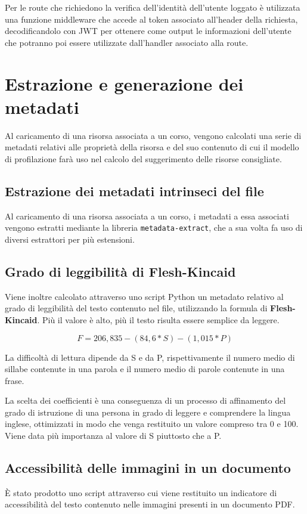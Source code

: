 Per le route che richiedono la verifica dell'identità dell'utente loggato è utilizzata una funzione middleware che accede al token associato all'header della richiesta, decodificandolo con JWT per ottenere come output le informazioni dell'utente che potranno poi essere utilizzate dall'handler associato alla route.

\section{Estrazione e generazione dei metadati}
Al caricamento di una risorsa associata a un corso, vengono calcolati una serie di metadati relativi alle proprietà della risorsa e del suo contenuto di cui il modello di profilazione farà uso nel calcolo del suggerimento delle risorse consigliate.

\subsection{Estrazione dei metadati intrinseci del file}
Al caricamento di una risorsa associata a un corso, i metadati a essa associati vengono estratti mediante la libreria \texttt{metadata-extract}, che a sua volta fa uso di diversi estrattori per più estensioni.

\subsection{Grado di leggibilità di Flesh-Kincaid}
Viene inoltre calcolato attraverso uno script Python un metadato relativo al grado di leggibilità del testo contenuto nel file, utilizzando la formula di \textbf{Flesh-Kincaid}. Più il valore è alto, più il testo risulta essere semplice da leggere.

\[ F=206,835-(84,6*S)-(1,015*P) \]

La difficoltà di lettura dipende da S e da P, rispettivamente il numero medio di sillabe contenute in una parola e il numero medio di parole contenute in una frase.

La scelta dei coefficienti è una conseguenza di un processo di affinamento del grado di istruzione di una persona in grado di leggere e comprendere la lingua inglese, ottimizzati in modo che venga restituito un valore compreso tra 0 e 100. Viene data più importanza al valore di S piuttosto che a P.\cite{readibility}

\subsection{Accessibilità delle immagini in un documento}
È stato prodotto uno script attraverso cui viene restituito un indicatore di accessibilità del testo contenuto nelle immagini presenti in un documento PDF.

